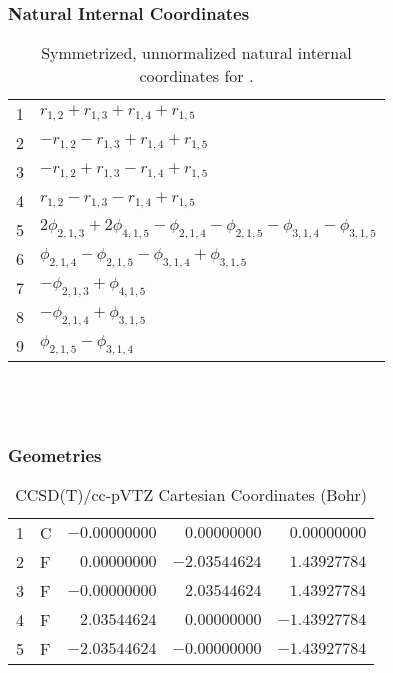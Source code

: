 \documentclass[10pt,oneside]{article}
\begin{document}
\subsubsection*{Natural Internal Coordinates}
\begin{table}[h!]
\centering
\caption{Symmetrized, unnormalized natural internal coordinates for .}
\small
\begin{tabular}{ll}
  1   & $r_{1,2} + r_{1,3} + r_{1,4} + r_{1,5}$ \\
  2   & $-r_{1,2} - r_{1,3} + r_{1,4} + r_{1,5}$ \\
  3   & $-r_{1,2} + r_{1,3} - r_{1,4} + r_{1,5}$ \\
  4   & $r_{1,2} - r_{1,3} - r_{1,4} + r_{1,5}$ \\
  5   & $2\phi_{2,1,3} + 2\phi_{4,1,5} - \phi_{2,1,4} - \phi_{2,1,5} - \phi_{3,1,4} - \phi_{3,1,5}$ \\
  6   & $\phi_{2,1,4} - \phi_{2,1,5} - \phi_{3,1,4} + \phi_{3,1,5}$ \\
  7   & $-\phi_{2,1,3} + \phi_{4,1,5}$ \\
  8   & $-\phi_{2,1,4} + \phi_{3,1,5}$ \\
  9   & $\phi_{2,1,5} - \phi_{3,1,4}$ \\
\end{tabular}
\end{table}

\clearpage

\subsection{\ \ \ }

\subsubsection*{Geometries}
\begin{table}[h!]
\centering
\caption{CCSD(T)/cc-pVTZ Cartesian Coordinates (Bohr)}
\begin{tabular}{llrrr}
1  & C  & $-0.00000000$ & $ 0.00000000$ & $ 0.00000000$ \\
2  & F  & $ 0.00000000$ & $-2.03544624$ & $ 1.43927784$ \\
3  & F  & $-0.00000000$ & $ 2.03544624$ & $ 1.43927784$ \\
4  & F  & $ 2.03544624$ & $ 0.00000000$ & $-1.43927784$ \\
5  & F  & $-2.03544624$ & $-0.00000000$ & $-1.43927784$ \\
\end{tabular}
\end{table}
\end{document}
